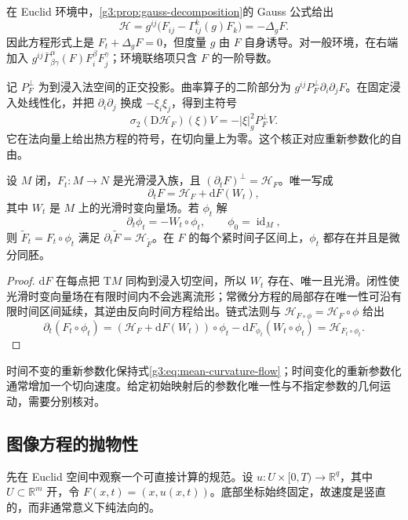 在 Euclid 环境中，\cref{g3:prop:gauss-decomposition}的 Gauss 公式给出
\begin{equation}\label{g3:eq:mcf-euclidean-coordinate}
	\mathcal H=g^{ij}\bigl(F_{ij}-\Gamma^k_{ij}(g)F_k\bigr)
	=-\Delta_gF.
\end{equation}
因此方程形式上是 \(F_t+\Delta_gF=0\)，但度量 \(g\) 由 \(F\) 自身诱导。对一般环境，在右端加入
\(g^{ij}\bar\Gamma^\alpha_{\beta\gamma}(F)F_i^\beta F_j^\gamma\)；环境联络项只含 \(F\) 的一阶导数。

\ProseParagraphBreak
记 \(P_F^\perp\) 为到浸入法空间的正交投影。曲率算子的二阶部分为 \(g^{ij}P_F^\perp\partial_i\partial_jF\)。在固定浸入处线性化，并把 \(\partial_i\partial_j\) 换成 \(-\xi_i\xi_j\)，得到主符号
\[
\sigma_2(\mathrm D\mathcal H_F)(\xi)V
=-|\xi|_g^2P_F^\perp V.
\]
它在法向量上给出热方程的符号，在切向量上为零。这个核正对应重新参数化的自由。

\begin{lemma}\label{g3:lem:mcf-reparametrization}
	设 \(M\) 闭，\(F_t:M\to N\) 是光滑浸入族，且 \((\partial_tF)^\perp=\mathcal H_F\)。唯一写成
	\[
	\partial_tF=\mathcal H_F+\mathrm dF(W_t),
	\]
	其中 \(W_t\) 是 \(M\) 上的光滑时变向量场。若 \(\phi_t\) 解
	\begin{equation}\label{g3:eq:mcf-tangential-ode}
		\partial_t\phi_t=-W_t\circ\phi_t,\qquad\phi_0=\operatorname{id}_M,
	\end{equation}
	则 \(\widetilde F_t=F_t\circ\phi_t\) 满足 \(\partial_t\widetilde F=\mathcal H_{\widetilde F}\)。在 \(F\) 的每个紧时间子区间上，\(\phi_t\) 都存在并且是微分同胚。
\end{lemma}
\begin{proof}
	\(\mathrm dF\) 在每点把 \(\mathrm TM\) 同构到浸入切空间，所以 \(W_t\) 存在、唯一且光滑。闭性使光滑时变向量场在有限时间内不会逃离流形；常微分方程的局部存在唯一性可沿有限时间区间延续，其逆由反向时间方程给出。链式法则与 \(\mathcal H_{F\circ\phi}=\mathcal H_F\circ\phi\) 给出
	\[
	\partial_t(F_t\circ\phi_t)
	=(\mathcal H_F+\mathrm dF(W_t))\circ\phi_t
	-\mathrm dF_{\phi_t}(W_t\circ\phi_t)
	=\mathcal H_{F_t\circ\phi_t}.
	\]
\end{proof}

时间不变的重新参数化保持式\eqref{g3:eq:mean-curvature-flow}；时间变化的重新参数化通常增加一个切向速度。给定初始映射后的参数化唯一性与不指定参数的几何运动，需要分别核对。

\subsection{图像方程的抛物性}
\label{g3:subsec:2801:02}
先在 Euclid 空间中观察一个可直接计算的规范。设 \(u:U\times[0,T)\to\mathbb R^q\)，其中 \(U\subset\mathbb R^m\) 开，令 \(F(x,t)=(x,u(x,t))\)。底部坐标始终固定，故速度是竖直的，而非通常意义下纯法向的。

